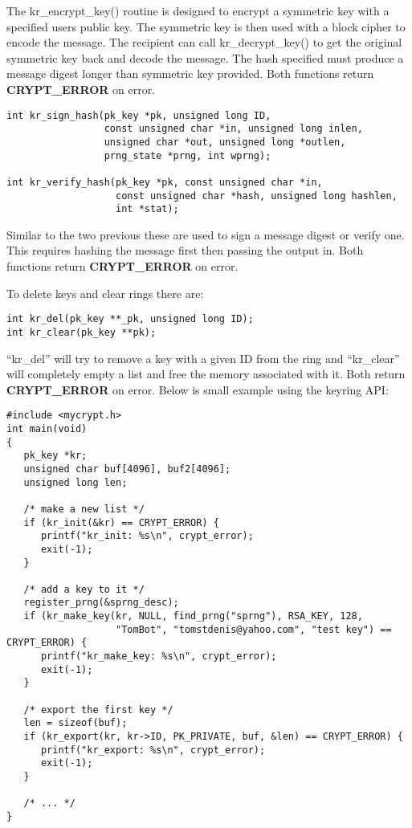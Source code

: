 \documentclass{book}
\begin{document}
The kr\_encrypt\_key() routine is designed to encrypt a symmetric key with a specified users public key.  The symmetric
key is then used with a block cipher to encode the message.  The recipient can call kr\_decrypt\_key() to get the original
symmetric key back and decode the message.  The hash specified must produce a message digest longer than symmetric key 
provided.  Both functions return {\bf CRYPT\_ERROR} on error.

\begin{verbatim}
int kr_sign_hash(pk_key *pk, unsigned long ID, 
                 const unsigned char *in, unsigned long inlen,
                 unsigned char *out, unsigned long *outlen,
                 prng_state *prng, int wprng);

int kr_verify_hash(pk_key *pk, const unsigned char *in, 
                   const unsigned char *hash, unsigned long hashlen,
                   int *stat);
\end{verbatim}

Similar to the two previous these are used to sign a message digest or verify one.  This requires hashing the message
first then passing the output in.  Both functions return {\bf CRYPT\_ERROR} on error.

To delete keys and clear rings there are:
\begin{verbatim}
int kr_del(pk_key **_pk, unsigned long ID);
int kr_clear(pk_key **pk);
\end{verbatim}
``kr\_del'' will try to remove a key with a given ID from the ring and ``kr\_clear'' will completely empty a list and free
the memory associated with it.  Both return {\bf CRYPT\_ERROR} on error.  Below is small example using the keyring API:

\begin{small}
\begin{verbatim}
#include <mycrypt.h>
int main(void)
{
   pk_key *kr;
   unsigned char buf[4096], buf2[4096];
   unsigned long len;

   /* make a new list */
   if (kr_init(&kr) == CRYPT_ERROR) {
      printf("kr_init: %s\n", crypt_error);
      exit(-1);
   }

   /* add a key to it */
   register_prng(&sprng_desc);
   if (kr_make_key(kr, NULL, find_prng("sprng"), RSA_KEY, 128, 
                   "TomBot", "tomstdenis@yahoo.com", "test key") == CRYPT_ERROR) {
      printf("kr_make_key: %s\n", crypt_error);
      exit(-1);
   }

   /* export the first key */
   len = sizeof(buf);
   if (kr_export(kr, kr->ID, PK_PRIVATE, buf, &len) == CRYPT_ERROR) {
      printf("kr_export: %s\n", crypt_error);
      exit(-1);
   }

   /* ... */
}  
\end{verbatim}
\end{small}
\end{document}
